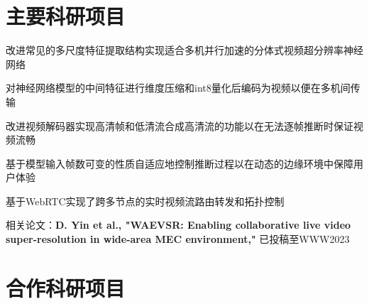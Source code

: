 \documentclass[]{deedy-resume-openfont}
\begin{document}
\hfill
\begin{minipage}[t]{0.77\textwidth}


	\section{主要科研项目}
	\vspace{\topsep}
	\begin{tightemize}
		\item 改进常见的多尺度特征提取结构实现适合多机并行加速的分体式视频超分辨率神经网络
		\item 对神经网络模型的中间特征进行维度压缩和int8量化后编码为视频以便在多机间传输
		\item 改进视频解码器实现高清帧和低清流合成高清流的功能以在无法逐帧推断时保证视频流畅
		\item 基于模型输入帧数可变的性质自适应地控制推断过程以在动态的边缘环境中保障用户体验
		\item 基于WebRTC实现了跨多节点的实时视频流路由转发和拓扑控制
		\item 相关论文：{\bfseries D. Yin et al., "WAEVSR: Enabling collaborative live video super-resolution in wide-area MEC environment,"} 已投稿至WWW2023
	\end{tightemize}
    \sectionsep

	\section{合作科研项目}
	

\end{minipage}
\end{document}
